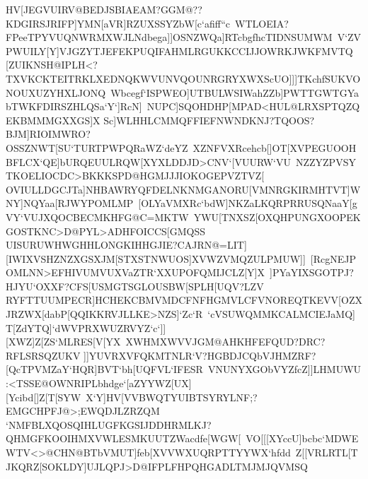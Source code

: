 {{ \hbox{HV[JEGVUIRV@BEDJSBIAEAM?GGM@??KDGIRSJRIFP]YMN[aVR]RZUXSSYZbW[c`afiff``c%
 WTLOEIA?FPeeTPYVUQNWRMXWJLNdbega]]OSNZWQa]RTcbgfhcTIDNSUMWM%
 V`ZVPWUILY[Y]VJGZYTJEFEKPUQIFAHMLRGUKKCCIJJOWRKJWKFMVTQ}
 \hbox{[ZUIKNSH@IPLH<?TXVKCKTEITRKLXEDNQKWVUNVQOUNRGRYXWXScUO]]]TKchfSUKVONOUXUZYHXLJONQ%
 Wbcegf`ISPWEO]UTBULWSIWahZZb]PWTTGWTGYabTWKFDIRSZHLQSa`Y`]RcN]%
 NUPC]SQOHDHP[MPAD<HUL@LRXSPTQZQEKBMMMGXXGS]X}
 \hbox{Sc]WLHHLCMMQFFIEFNWNDKNJ?TQOOS?BJM]RIOIMWRO?OSSZNWT[SU`TURTPWPQRaWZ`deYZ%
 XZNFVXRcehcb[]OT[XVPEGUOOHBFLCX`QE]bURQEUULRQW[XYXLDDJD>CNV`[VUURW`VU%
 NZZYZPVSYTKOELIOCDC>BKKKSPD@HGMJJJIOKOGEPVZTVZ[}
 \hbox{OVIULLDGCJTa]NHBAWRYQFDELNKNMGANORU[VMNRGKIRMHTVT]WNY]NQYaa[RJWYPOMLMP%
 [OLYaVMXRc`bdW]NKZaLKQRPRRUSQNaaY[gVY`VUJXQOCBECMKHFG@C=MKTW%
 YWU[TNXSZ[OXQHPUNGXOOPEKGOSTKNC>D@PYL>ADHFOICCS[GMQSS}
 \hbox{UISURUWHWGHHLONGKIHHGJIE?CAJRN@=LIT][IWIXVSHZNZXGSXJM[STXSTNWUOS]XVWZVMQZULPMUW]]%
 [RcgNEJPOMLNN>EFHIVUMVUXVaZTR`XXUPOFQMIJCLZ[Y]X%
 ]PYaYIXSGOTPJ?HJYU`OXXF?CFS[USMGTSGLOUSBW[SPLH[UQV?LZV}
 \hbox{RYFTTUUMPECR]HCHEKCBMVMDCFNFHGMVLCFVNOREQTKEVV[OZXJRZWX[dabP[QQIKKRVJLLKE>NZS]`Zc`R%
 `cVSUWQMMKCALMCIEJaMQ]T[ZdYTQ]`dWVPRXWUZRVYZ`c`]][XWZ]Z[ZS`MLRES[V[YX%
 XWHMXWVVJGM@AHKHFEFQUD?DRC?RFLSRSQZUKV}
 \hbox{]]YUVRXVFQKMTNLR`V?HGBDJCQbVJHMZRF?[QcTPVMZaY`HQR]BVT`bh[UQFVL`IFESR%
 VNUNYXGObVYZfcZ]]LHMUWU:<TSSE@OWNRIPLbhdge`[aZYYWZ[UX][Ycibd[]Z[T[SYW%
 X`Y]HV[VVBWQTYUIBTSYRYLNF;?EMGCHPFJ@>;EWQDJLZRZQM}
 \hbox{`NMFBLXQOSQIHLUGFKGSIJDDHRMLKJ?QHMGFKOOIHMXVWLESMKUUTZWacdfe[WGW[%
 VO[[[XYccU]bcbc`MDWEWTV<>@CHN@BTbVMUT]feb[XVVWXUQRPTTYYWX`hfdd%
 Z[[VRLRTL[TJKQRZ[SOKLDY]UJLQPJ>D@IFPLFHPQHGADLTMJMJQVMSQ}
}}
